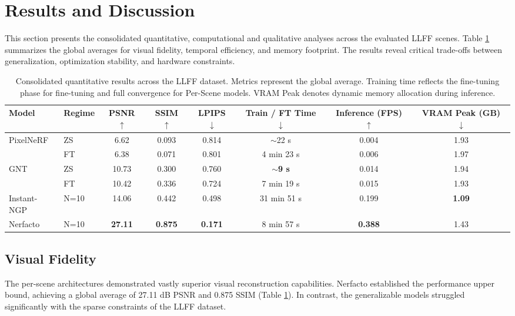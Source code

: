 \section{Results and Discussion}
\label{sec:results}

This section presents the consolidated quantitative, computational and qualitative analyses across the evaluated LLFF scenes. Table \ref{tab:super_results} summarizes the global averages for visual fidelity, temporal efficiency, and memory footprint. The results reveal critical trade-offs between generalization, optimization stability, and hardware constraints.

\begin{table}[H]
\centering
\caption{Consolidated quantitative results across the LLFF dataset. Metrics represent the global average. Training time reflects the fine-tuning phase for fine-tuning and full convergence for Per-Scene models. VRAM Peak denotes dynamic memory allocation during inference.}
\label{tab:super_results}
\scriptsize
\begin{tabular*}{\linewidth}{@{\extracolsep{\fill}}llcccccc@{\extracolsep{0pt}}}
\toprule
Model & Regime 
  & PSNR $\uparrow$ 
  & SSIM $\uparrow$ 
  & LPIPS $\downarrow$ 
  & Train / FT Time $\downarrow$
  & Inference (FPS) $\uparrow$ 
  & VRAM Peak (GB) $\downarrow$ \\
\midrule
\multirow{2}{*}{PixelNeRF}
 & ZS  & 6.62  & 0.093 & 0.814 & $\sim$22 s   & 0.004 & 1.93 \\
 & FT  & 6.38  & 0.071 & 0.801 & 4 min 23 s   & 0.006 & 1.97 \\
\midrule
\multirow{2}{*}{GNT}
 & ZS  & 10.73 & 0.300 & 0.760 & \textbf{$\sim$9 s}    & 0.014 & 1.94 \\
 & FT  & 10.42 & 0.336 & 0.724 & 7 min 19 s   & 0.015 & 1.93 \\
\midrule
Instant-NGP
 & N=10   & 14.06 & 0.442 & 0.498 & 31 min 51 s  & 0.199 & \textbf{1.09} \\
\midrule
Nerfacto
 & N=10      & \textbf{27.11} & \textbf{0.875} & \textbf{0.171} & 8 min 57 s   & \textbf{0.388} & 1.43 \\
\bottomrule
\end{tabular*}
\end{table}

\subsection{Visual Fidelity}
The per-scene architectures demonstrated vastly superior visual reconstruction capabilities. Nerfacto established the performance upper bound, achieving a global average of 27.11 dB PSNR and 0.875 SSIM (Table \ref{tab:super_results}). In contrast, the generalizable models struggled significantly with the sparse constraints of the LLFF dataset.

